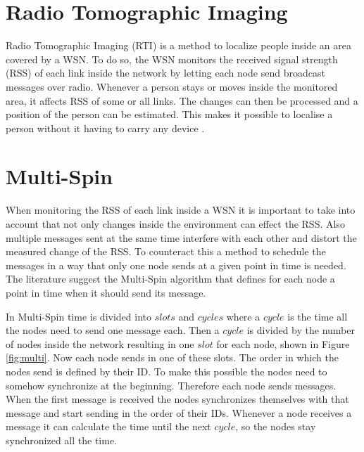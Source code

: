 	



\section{Radio Tomographic Imaging}
Radio Tomographic Imaging (RTI) is a method to localize people inside an area covered by a WSN. To do so, the WSN monitors the received signal strength (RSS) of each link inside the network by letting each node send broadcast messages over radio. Whenever a person stays or moves inside the monitored area, it affects RSS of some or all links. The changes can then be processed and a position of the person can be estimated. This makes it possible to localise a person without it having to carry any device \cite{RtiMulti}.
\section{Multi-Spin}
When monitoring the RSS of each link inside a WSN it is important to take into account that not only changes inside the environment can effect the RSS. Also multiple messages sent at the same time interfere with each other and distort the measured change of the RSS. To counteract this a method to schedule the messages in a way that only one node sends at a given point in time is needed. The literature suggest the Multi-Spin algorithm that defines for each node a point in time when it should send its message.

In Multi-Spin time is divided into $slots$ and $cycles$ where a $cycle$ is the time all the nodes need to send one message each. Then a $cycle$ is divided by the number of nodes inside the network resulting in one $slot$ for each node, shown in Figure \ref{fig:multi}. Now each node sends in one of these slots. The order in which the nodes send is defined by their ID. To make this possible the nodes need to somehow synchronize at the beginning. Therefore each node sends messages. When the first message is received the nodes synchronizes themselves with that message and start sending in the order of their IDs. Whenever a node receives a message it can calculate the time until the next $cycle$, so the nodes stay synchronized all the time.  \cite{RtiMulti}

